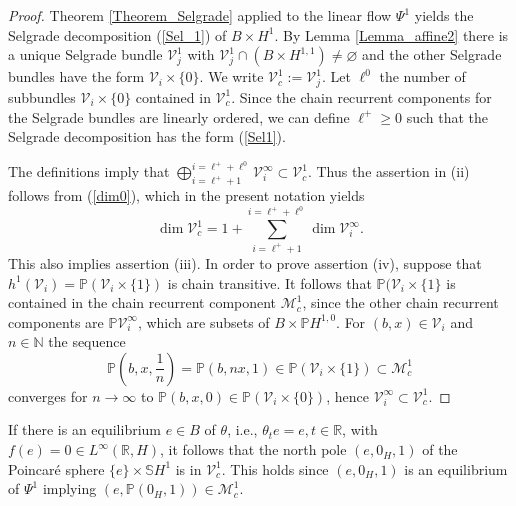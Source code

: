 	\begin{proof}
		Theorem \ref{Theorem_Selgrade} applied to the linear flow $\Psi^{1}$ yields
		the Selgrade decomposition (\ref{Sel_1}) of $B\times H^{1}$. By Lemma
		\ref{Lemma_affine2} there is a unique Selgrade bundle $\mathcal{V}_{j}^{1}$
		with $\mathcal{V}_{j}^{1}\cap\left(  B\times H^{1,1}\right)  \not =%
		\varnothing$ and the other Selgrade bundles have the form $\mathcal{V}%
		_{i}\times\{0\}$. We write $\mathcal{V}_{c}^{1}:=\mathcal{V}_{j}^{1}$. Let
		$\ell^{0}$ the number of subbundles $\mathcal{V}_{i}\times\{0\}$ contained in
		$\mathcal{V}_{c}^{1}$. Since the chain recurrent components for the Selgrade
		bundles are linearly ordered, we can define $\ell^{+}\geq0$ such that the
		Selgrade decomposition has the form (\ref{Sel1}).
		
		The definitions imply that $\bigoplus_{i=\ell^{+}+1}^{i=\ell^{+}+\ell^{0}%
		}\mathcal{V}_{i}^{\infty}\subset\mathcal{V}_{c}^{1}$. Thus the assertion in
		(ii) follows from (\ref{dim0}), which in the present notation yields
		\[
		\dim\mathcal{V}_{c}^{1}=1+\sum_{i=\ell^{+}+1}^{i=\ell^{+}+\ell^{0}}%
		\dim\mathcal{V}_{i}^{\infty}.
		\]
		This also implies assertion (iii). In order to prove assertion (iv), suppose
		that $h^{1}(\mathcal{V}_{i})=\mathbb{P}(\mathcal{V}_{i}\times\{1\})$ is chain
		transitive. It follows that $\mathbb{P}(\mathcal{V}_{i}\times\{1\}$ is
		contained in the chain recurrent component $\mathcal{M}_{c}^{1}$, since the
		other chain recurrent components are $\mathbb{P}\mathcal{V}_{i}^{\infty}$,
		which are subsets of $B\times\mathbb{P}H^{1,0}$. For $(b,x)\in\mathcal{V}_{i}$
		and $n\in\mathbb{N}$ the sequence
		\[
		\mathbb{P}(b,x,\frac{1}{n})=\mathbb{P}(b,nx,1)\in\mathbb{P}\left(
		\mathcal{V}_{i}\times\{1\}\right)  \subset\mathcal{M}_{c}^{1}%
		\]
		converges for $n\rightarrow\infty$ to $\mathbb{P}(b,x,0)\in\mathbb{P}\left(
		\mathcal{V}_{i}\times\{0\}\right)  $, hence $\mathcal{V}_{i}^{\infty}%
		\subset\mathcal{V}_{c}^{1}$.
	\end{proof}
	
	\begin{remark}
		If there is an equilibrium $e\in B$ of $\theta$, i.e., $\theta_{t}%
		e=e,t\in\mathbb{R}$, with $f(e)=0\in L^{\infty}(\mathbb{R},H)$, it follows
		that the north pole $(e,0_{H},1)$ of the Poincar\'{e} sphere $\{e\}\times
		\mathbb{S}H^{1}$ is in $\mathcal{V}_{c}^{1}$. This holds since $(e,0_{H},1)$
		is an equilibrium of $\Psi^{1}$ implying $(e,\mathbb{P}\left(  0_{H},1\right)
		)\in\mathcal{M}_{c}^{1}$.
	\end{remark}
	
